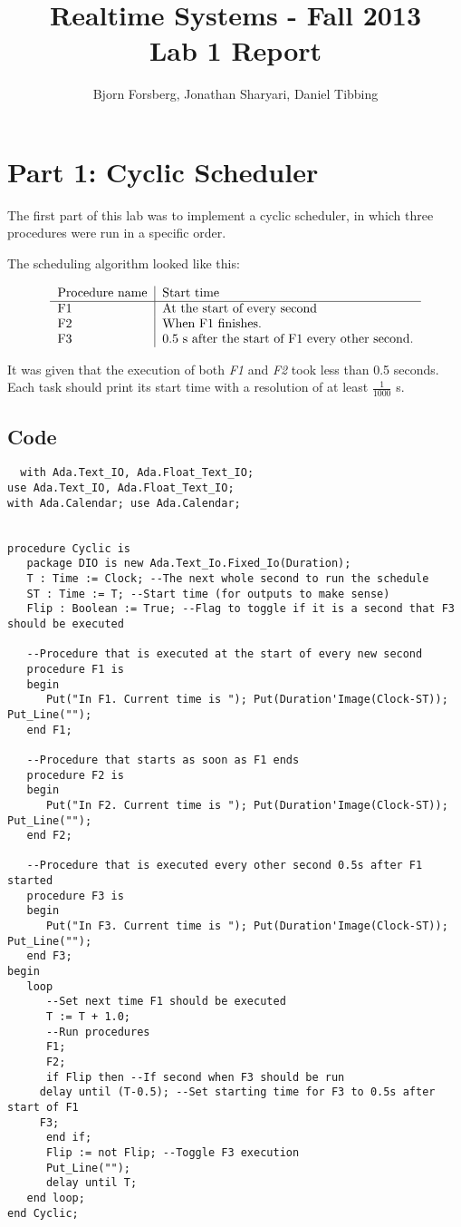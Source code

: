 \documentclass[a4paper,10pt]{article}
\title{Realtime Systems - Fall 2013 \\ \textbf{Lab 1 Report}}
\author{Bjorn Forsberg, Jonathan Sharyari, Daniel Tibbing}
\begin{document}
\maketitle

\section{Part 1: Cyclic Scheduler}

The first part of this lab was to implement a cyclic scheduler, in which three procedures were run in a specific order.

The scheduling algorithm looked like this:

\[
\begin{tabular}{l | l }
  Procedure name & Start time  \\
  \hline
  F1 & At the start of every second \\
  F2 & When F1 finishes. \\
  F3 & 0.5 s after the start of F1 every other second.
\end{tabular}
\]

It was given that the execution of both \emph{F1} and \emph{F2} took less than 0.5 seconds. Each task should print its start time with a resolution of at least $\frac{1}{1000}$ s.

\subsection{Code}

\begin{lstlisting}
  with Ada.Text_IO, Ada.Float_Text_IO;
use Ada.Text_IO, Ada.Float_Text_IO;
with Ada.Calendar; use Ada.Calendar;


procedure Cyclic is
   package DIO is new Ada.Text_Io.Fixed_Io(Duration);
   T : Time := Clock; --The next whole second to run the schedule
   ST : Time := T; --Start time (for outputs to make sense)
   Flip : Boolean := True; --Flag to toggle if it is a second that F3 should be executed
   
   --Procedure that is executed at the start of every new second 
   procedure F1 is
   begin
      Put("In F1. Current time is "); Put(Duration'Image(Clock-ST)); Put_Line("");   
   end F1;
   
   --Procedure that starts as soon as F1 ends
   procedure F2 is
   begin
      Put("In F2. Current time is "); Put(Duration'Image(Clock-ST)); Put_Line("");   
   end F2;
   
   --Procedure that is executed every other second 0.5s after F1 started
   procedure F3 is
   begin
      Put("In F3. Current time is "); Put(Duration'Image(Clock-ST)); Put_Line("");
   end F3;
begin
   loop
      --Set next time F1 should be executed 
      T := T + 1.0;
      --Run procedures	
      F1;
      F2;  
      if Flip then --If second when F3 should be run
	 delay until (T-0.5); --Set starting time for F3 to 0.5s after start of F1
	 F3;
      end if;
      Flip := not Flip; --Toggle F3 execution
      Put_Line("");
      delay until T;
   end loop;
end Cyclic;
\end{lstlisting}
\end{document}
